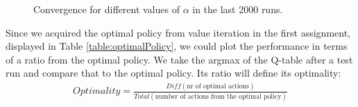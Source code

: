 \documentclass[paper=a4, fontsize=11pt]{scrartcl}
\numberwithin{equation}{section}		%
\numberwithin{figure}{section}			%
\numberwithin{table}{section}				%
\begin{document}
\begin{figure}[H] \centering
\caption{Convergence for different values of $\alpha$ in the last 2000 runs.} 
\label{figure:alphalast20}
\end{figure}
Since we acquired the optimal policy from value iteration in the first assignment, displayed in Table \ref{table:optimalPolicy}, we could plot the performance in terms of a ratio from the optimal policy. We take the argmax of the Q-table after a test run and compare that to the optimal policy. Its ratio will define its optimality:
\begin{align}
Optimality = \frac{Diff(\text{nr of optimal actions})}{Total(\text{number of actions from the optimal policy})}
\end{align}
\end{document}

